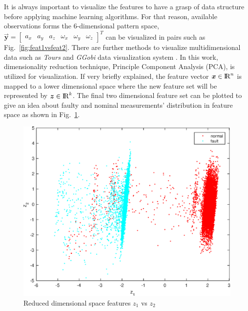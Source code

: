 It is always important to visualize the features to have a grasp of data structure before applying machine learning algorithms. 
For that reason, available observations forms the 6-dimensional pattern space,  $\vec{\bm{y}} = \begin{bmatrix} {a_x} & {a_y} & {a_z} & {\omega_x} & {\omega_y} & {\omega_z}  \end{bmatrix}^T$ can be visualized in pairs such as Fig.~\ref{fig:feat1vsfeat2}. 
There are further methods to visualize multidimensional data such as \emph{Tours}\cite{asimov1985grand,cook1997manual,cook1995grand} and \emph{GGobi} data visualization system \cite{cook2007interactive}. In this work, dimensionality reduction technique, Principle Component Analysis (PCA), is utilized for visualization. If very briefly explained, the feature vector $\bm{x}\in{\rm I\!R}^{n}$ is mapped to a lower dimensional space where the 
new feature set will be represented by $\bm{z}\in{\rm I\!R}^{k}$. The final two dimensional feature set can be plotted to give an idea about faulty and nominal measurements' distribution in feature space as shown in Fig.~\ref{fig:z1_vs_z2}.

\begin{figure}
\begin{center}
\includegraphics[width=12cm]{figures/reduceDimMeasurements}    %
\caption{Reduced dimensional space features $z_1$ vs $z_2$ } 
\label{fig:z1_vs_z2}
\end{center}
\end{figure}

